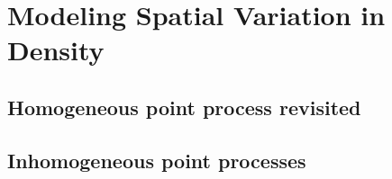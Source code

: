 \chapter{
Modeling Spatial Variation in Density
}
\label{chapt.state-space}


\section{Homogeneous point process revisited}

\begin{figure}
\centering

\label{state-space.fig.homo}
\end{figure}

\section{Inhomogeneous point processes}

\begin{equation}
  \label{state-space.eq.loglin}
\end{equation}

\begin{equation}
\label{state-space.eq.EN}
\end{equation}

\begin{equation}
  \label{state-space.eq.uprior}
\end{equation}

\begin{equation}
\label{state-space.eq.pdf.hetero}
\end{equation}

\begin{equation}
\label{state-space.eq.pdf.hetero.d}
\end{equation}

\begin{equation}
\label{state-space.eq.psimu}
\end{equation}

